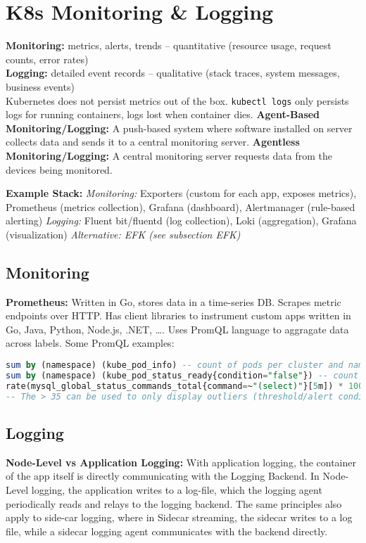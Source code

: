 \section{K8s Monitoring \& Logging}
\textbf{Monitoring:} metrics, alerts, trends – quantitative (resource usage, request counts, error rates)\\
\textbf{Logging:} detailed event records – qualitative (stack traces, system messages, business events) \\
Kubernetes does not persist metrics out of the box. \texttt{kubectl logs} only persists logs for running containers, logs lost when container dies.
\textbf{Agent-Based Monitoring/Logging:} A push-based system where software installed on server collects data and sends it to a central monitoring server. \textbf{Agentless Monitoring/Logging:} A central monitoring server requests data from the devices being monitored.

\begin{mdframed}
	\textbf{Example Stack:} \textit{Monitoring:} Exporters (custom for each app, exposes metrics), Prometheus (metrics collection), Grafana (dashboard), Alertmanager (rule-based alerting) \textit{Logging:} Fluent bit/fluentd (log collection), Loki (aggregation), Grafana (visualization)
	\textit{Alternative: EFK (see subsection EFK)}
\end{mdframed}

\subsection{Monitoring}
\textbf{Prometheus:} Written in Go, stores data in a time-series DB. Scrapes metric endpoints over HTTP. Has client libraries to instrument custom apps written in Go, Java, Python, Node.js, .NET, \dots. Uses PromQL language to aggragate data across labels. Some PromQL examples:
\begin{lstlisting}[language=sql]
sum by (namespace) (kube_pod_info) -- count of pods per cluster and namespace
sum by (namespace) (kube_pod_status_ready{condition="false"}) -- count of pods not ready by namespace
rate(mysql_global_status_commands_total{command=~"(select)"}[5m]) * 100 > 35 -- Rate of MySQL SELECT commands over last 5 minutes
-- The > 35 can be used to only display outliers (threshold/alert conditions)
\end{lstlisting}

\subsection{Logging}
\textbf{Node-Level vs Application Logging:} With application logging, the container of the app itself is directly communicating with the Logging Backend. In Node-Level logging, the application writes to a log-file, which the logging agent periodically reads and relays to the logging backend. The same principles also apply to side-car logging, where in Sidecar streaming, the sidecar writes to a log file, while a sidecar logging agent communicates with the backend directly.

